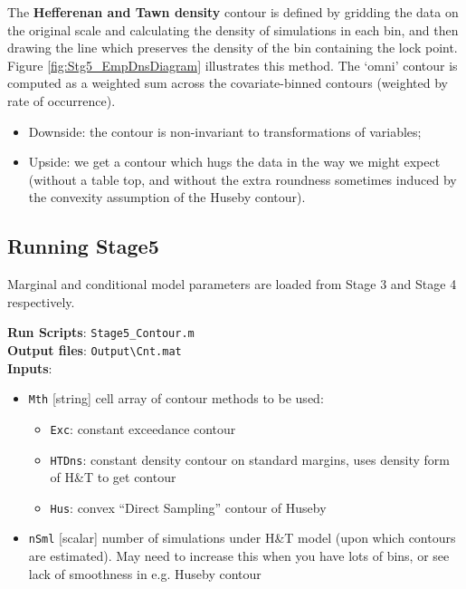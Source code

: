 The \noindent\textbf{Hefferenan and Tawn density} contour is defined by gridding the data on the original scale and calculating the density of simulations in each bin, and then drawing the line which preserves the density of the bin containing the lock point. Figure \ref{fig:Stg5_EmpDnsDiagram} illustrates this method. The `omni' contour is computed as a weighted sum across the covariate-binned contours (weighted by rate of occurrence).
\begin{itemize}
\item Downside: the contour is non-invariant to transformations of variables;
\item Upside: we get a contour which hugs the data in the way we might expect (without a table top, and without the extra roundness sometimes induced by the convexity assumption of the Huseby contour).
\end{itemize}


\subsection{Running Stage5}
Marginal and conditional model parameters are loaded from Stage 3 and Stage 4 respectively.

\textbf{Run Scripts}: \verb|Stage5_Contour.m|\\
\textbf{Output files}: \verb|Output\Cnt.mat|\\

\textbf{Inputs}:
\begin{itemize}
\item \verb|Mth| [string] cell array of contour methods to be used:
	\begin{itemize}
		\item \verb|Exc|: constant exceedance contour
  		\item \verb|HTDns|: constant density contour on standard margins, uses density form of H\&T to get contour        
  		\item \verb|Hus|: convex ``Direct Sampling'' contour of Huseby
	\end{itemize}
\item \verb|nSml| [scalar] number of simulations under H\&T model (upon which contours are estimated). May need to increase this when you have lots of bins, or see lack of smoothness in e.g. Huseby contour
\end{itemize}


